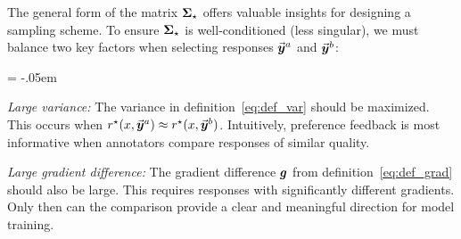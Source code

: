 {    The general form of the matrix $\boldsymbol{\Sigma}_{\star}$ offers valuable insights for designing a sampling scheme. To ensure $\boldsymbol{\Sigma}_{\star}$ is well-conditioned (less singular), we must balance two key factors when selecting responses $\vec{\boldsymbol{y}}\!\,^a$ and $\vec{\boldsymbol{y}}\!\,^b$:
    \vspace{-.8em}
    \begin{description} \itemsep = -.05em
        \item \emph{Large variance:} The variance in definition~\eqref{eq:def_var} should be maximized. This occurs when $r^{\star}(x, \vec{\boldsymbol{y}}\!\,^a) \approx r^{\star}(x, \vec{\boldsymbol{y}}\!\,^b)$. Intuitively, preference feedback is most informative when annotators compare responses of similar quality.
        \item \emph{Large gradient difference:} The gradient difference $\boldsymbol{g}$ from definition~\eqref{eq:def_grad} should also be large. This requires responses with significantly different gradients. Only then can the comparison provide a clear and meaningful direction for model training.
    \end{description}
    }

    \fi




